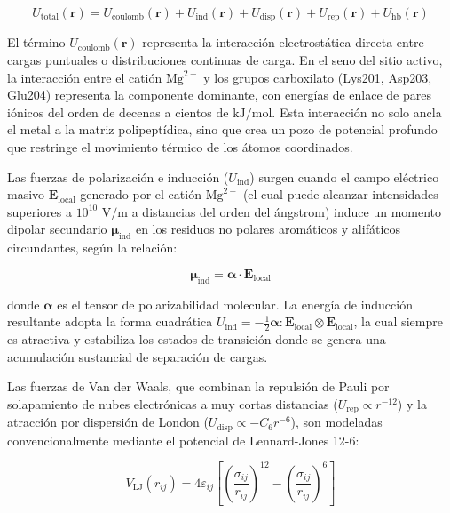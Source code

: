 \documentclass[12pt]{article}
\begin{document}
\begin{equation}
U_{\text{total}}(\mathbf{r}) = U_{\text{coulomb}}(\mathbf{r}) + U_{\text{ind}}(\mathbf{r}) + U_{\text{disp}}(\mathbf{r}) + U_{\text{rep}}(\mathbf{r}) + U_{\text{hb}}(\mathbf{r})
\end{equation}

El término $U_{\text{coulomb}}(\mathbf{r})$ representa la interacción electrostática directa entre cargas puntuales o distribuciones continuas de carga. En el seno del sitio activo, la interacción entre el catión $\text{Mg}^{2+}$ y los grupos carboxilato (Lys201, Asp203, Glu204) representa la componente dominante, con energías de enlace de pares iónicos del orden de decenas a cientos de $\text{kJ/mol}$. Esta interacción no solo ancla el metal a la matriz polipeptídica, sino que crea un pozo de potencial profundo que restringe el movimiento térmico de los átomos coordinados.

Las fuerzas de polarización e inducción ($U_{\text{ind}}$) surgen cuando el campo eléctrico masivo $\mathbf{E}_{\text{local}}$ generado por el catión $\text{Mg}^{2+}$ (el cual puede alcanzar intensidades superiores a $10^{10} \text{ V/m}$ a distancias del orden del ángstrom) induce un momento dipolar secundario $\boldsymbol{\mu}_{\text{ind}}$ en los residuos no polares aromáticos y alifáticos circundantes, según la relación:

\begin{equation}
\boldsymbol{\mu}_{\text{ind}} = \boldsymbol{\alpha} \cdot \mathbf{E}_{\text{local}}
\end{equation}

donde $\boldsymbol{\alpha}$ es el tensor de polarizabilidad molecular. La energía de inducción resultante adopta la forma cuadrática $U_{\text{ind}} = -\frac{1}{2} \boldsymbol{\alpha} : \mathbf{E}_{\text{local}} \otimes \mathbf{E}_{\text{local}}$, la cual siempre es atractiva y estabiliza los estados de transición donde se genera una acumulación sustancial de separación de cargas.

Las fuerzas de Van der Waals, que combinan la repulsión de Pauli por solapamiento de nubes electrónicas a muy cortas distancias ($U_{\text{rep}} \propto r^{-12}$) y la atracción por dispersión de London ($U_{\text{disp}} \propto -C_6 r^{-6}$), son modeladas convencionalmente mediante el potencial de Lennard-Jones 12-6:

\begin{equation}
V_{\text{LJ}}(r_{ij}) = 4 \varepsilon_{ij} \left[ \left( \frac{\sigma_{ij}}{r_{ij}} \right)^{12} - \left( \frac{\sigma_{ij}}{r_{ij}} \right)^{6} \right]
\end{equation}
\end{document}

